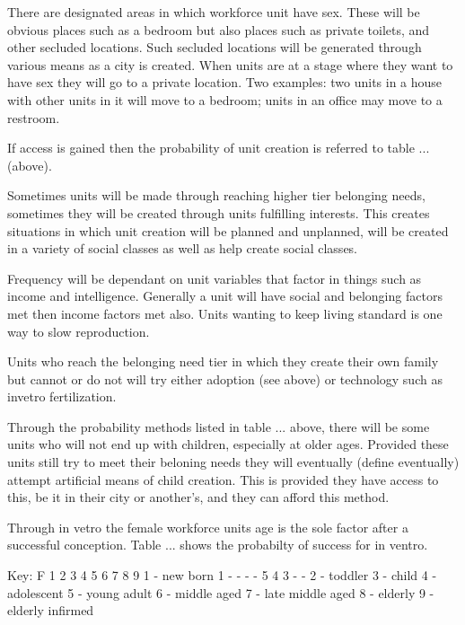 There are designated areas in which workforce unit have sex. These will be obvious places such as a bedroom but also places such as private toilets, and other secluded locations. Such secluded locations will be generated through various means as a city is created. When units are at a stage where they want to have sex they will go to a private location. Two examples: two units in a house with other units in it will move to a bedroom; units in an office may move to a restroom. 

If access is gained then the probability of unit creation is referred to table ... (above).

Sometimes units will be made through reaching higher tier belonging needs, sometimes they will be created through units fulfilling interests. This creates situations in which unit creation will be planned and unplanned, will be created in a variety of social classes as well as help create social classes.

Frequency will be dependant on unit variables that factor in things such as income and intelligence.
Generally a unit will have social and belonging factors met then income factors met also. 
Units wanting to keep living standard is one way to slow reproduction.



Units who reach the belonging need tier in which they create their own family but cannot or do not will try either adoption (see above) or technology such as invetro fertilization. 

Through the probability methods listed in table ... above, there will be some units who will not end up with children, especially at older ages. Provided these units still try to meet their beloning needs they will eventually (define eventually) attempt artificial means of child creation. This is provided they have access to this, be it in their city or another's, and they can afford this method.

Through in vetro the female workforce units age is the sole factor after a successful conception. Table ... shows the probabilty of success for in ventro.

			        Key:
F 1  2  3  4  5  6  7  8  9     1 - new born
1 -  -  -  -  5  4  3  -  -     2 - toddler
				3 - child
				4 - adolescent
				5 - young adult
				6 - middle aged
				7 - late middle aged
				8 - elderly 
				9 - elderly infirmed

